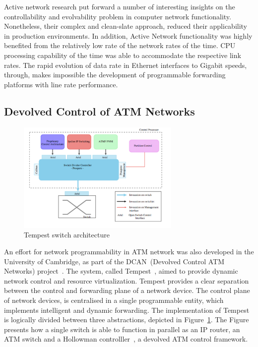 Active network research put forward a number of interesting insights on the
controllability and evolvability problem in computer network functionality.
Nonetheless, their complex and clean-slate approach, reduced their applicability
in production environments. In addition, Active Network functionality was highly
benefited from the relatively low rate of the network rates of the time. CPU
processing capability of the time was able to accommodate the respective link
rates. The rapid evolution of data rate in Ethernet interfaces to Gigabit
speeds, through, makes impossible the development of programmable forwarding
platforms with line rate performance. 

\subsection{Devolved Control of ATM Networks}

\begin{figure}
  \begin{center}
\includegraphics[width=0.7\textwidth]{Background/BackgroundFigs/tempest_arch}
\caption{Tempest switch architecture~\cite{UCAM-CL-TR-450}}
\label{fig:background:tempest_arch}
\end{center}
\end{figure}

An effort for network programmability in ATM network was also developed in the
University of Cambridge, as part of the DCAN~(Devolved Control ATM Networks)
project~\cite{dcan}.  The system, called Tempest~\cite{Rooney1998}, aimed to
provide dynamic network control and resource virtualization. Tempest provides a
clear separation between the control and forwarding plane of a network device.
The control plane of network devices, is centralised in a single programmable
entity, which implements intelligent and dynamic forwarding.  The implementation
of Tempest is logically divided between three abstractions, depicted in
Figure~\ref{fig:background:tempest_arch}. The Figure presents how a single
switch is able to function in parallel as an IP router, an ATM switch and a
Hollowman controlller~\cite{Rooney1997}, a devolved ATM control framework. 

